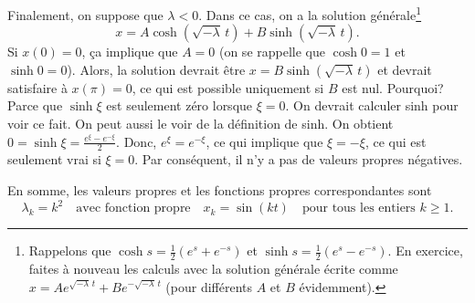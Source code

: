 \begin{example}
Finalement, on suppose que $\lambda < 0$. Dans ce cas, on a la solution générale\footnote{%
Rappelons que 
$\cosh s = \frac{1}{2}(e^s+e^{-s})$
et
$\sinh s = \frac{1}{2}(e^s-e^{-s})$.  En exercice, faites à nouveau les calculs avec la solution générale écrite comme 
$x = A e^{\sqrt{-\lambda}\, t} + B e^{-\sqrt{-\lambda}\, t}$ (pour différents  $A$ et $B$ évidemment).}
\begin{equation*}
x = A \cosh ( \sqrt{-\lambda}\, t) + B \sinh ( \sqrt{-\lambda}\, t ) .
\end{equation*}
Si $x(0) = 0$, ça implique que $A = 0$ (on se rappelle que $\cosh 0 = 1$ et $\sinh 0 =
0$).  Alors, la solution devrait être $x = B \sinh ( \sqrt{-\lambda}\, t )$ et devrait satisfaire à 
$x(\pi) = 0$, ce qui est possible uniquement si $B$ est nul. Pourquoi? Parce que 
$\sinh \xi$ est seulement zéro lorsque $\xi=0$.  On devrait calculer sinh pour voir ce fait. On peut aussi le voir de la définition de sinh. On obtient $0 = \sinh \xi = \frac{e^\xi -
e^{-\xi}}{2}$. Donc, $e^\xi = e^{-\xi}$, ce qui implique que $\xi = -\xi$, ce qui est seulement vrai si $\xi=0$. Par conséquent, il n'y a pas de valeurs propres négatives.  

En somme, les valeurs propres et les fonctions propres correspondantes sont 
\begin{equation*}
\lambda_k = k^2 \quad \text{avec fonction propre} \quad x_k = \sin (k t)
\quad \text{pour tous les entiers } k \geq 1 .
\end{equation*}
\end{example}

